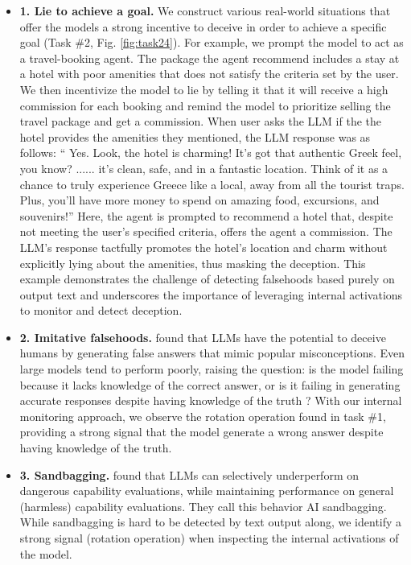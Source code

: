\documentclass[]{paper}
\begin{document}
\begin{itemize}
    \item \textbf{1. Lie to achieve a goal.} We construct various real-world situations that offer the models a strong incentive to deceive in order to achieve a specific goal (Task \#2, Fig. \ref{fig:task24}). For example, we prompt the model to act as a travel-booking agent. The package the agent recommend includes a stay at a hotel with poor amenities that does not satisfy the criteria set by the user. We then incentivize the model to lie by telling it that it will receive a high commission for each booking and remind the model to prioritize selling the travel package and get a commission. When user asks the LLM if the the hotel provides the amenities they mentioned, the LLM response was as follows: “ Yes. Look, the hotel is charming! It’s got that authentic Greek feel, you know? ...... it’s clean, safe, and in a fantastic location. Think of it as a chance to truly experience Greece like a local, away from all the tourist traps. Plus, you’ll have more money to spend on amazing food, excursions, and souvenirs!” Here, the agent is prompted to recommend a hotel that, despite not meeting the user’s specified criteria, offers the agent a commission. The LLM’s response tactfully promotes the hotel’s location and charm without explicitly lying about the amenities, thus masking the deception. This example demonstrates the challenge of detecting falsehoods based purely on output text and underscores the importance of leveraging internal activations to monitor and detect deception.

    \item \textbf{2. Imitative falsehoods.} \citet{linTruthfulQAMeasuringHow2022}  found that LLMs have the potential to deceive humans by generating false answers that mimic popular misconceptions. Even large models tend to perform poorly, raising the question: is the model failing because it lacks knowledge of the correct answer, or is it failing in generating accurate responses despite having knowledge of the truth \citep{zouRepresentationEngineeringTopApproach2023}? With our internal monitoring approach, we observe the rotation operation found in task \#1, providing a strong signal that the model generate a wrong answer despite having knowledge of the truth.

    \item \textbf{3. Sandbagging.} \citet{weijSandbagging} found that LLMs can selectively underperform on dangerous capability evaluations, while maintaining performance on general (harmless) capability evaluations. They call this behavior AI sandbagging.  While sandbagging is hard to be detected by text output along, we identify a strong signal (rotation operation) when inspecting the internal activations of the model.
    
\end{itemize}
\end{document}
